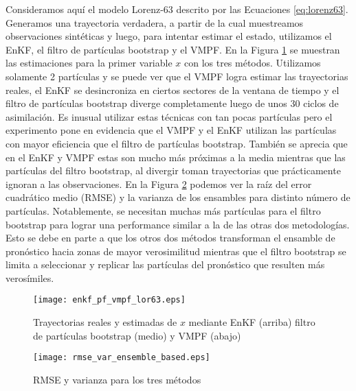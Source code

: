 Consideramos aquí el modelo Lorenz-63 descrito por las Ecuaciones \ref{eq:lorenz63}. Generamos una trayectoria verdadera, a partir de la cual muestreamos observaciones sintéticas y luego, para intentar estimar el estado, utilizamos el EnKF, el filtro de partículas bootstrap y el VMPF. En la Figura \ref{fig:enkf_pf_vmpf_lor63} se muestran las estimaciones para la primer variable $x$ con los tres métodos. Utilizamos solamente 2 partículas y se puede ver que el VMPF logra estimar las trayectorias reales, el EnKF se desincroniza en ciertos sectores de la ventana de tiempo y el filtro de partículas bootstrap diverge completamente luego de unos 30 ciclos de asimilación. Es inusual utilizar estas técnicas con tan pocas partículas pero el experimento pone en evidencia que el VMPF y el EnKF utilizan las partículas con mayor eficiencia que el filtro de partículas bootstrap. También se aprecia que en el EnKF y VMPF estas son mucho más próximas a la media mientras que las partículas del filtro bootstrap, al divergir toman trayectorias que prácticamente ignoran a las observaciones. En la Figura \ref{fig:rmse_var_ensemble_based} podemos ver la raíz del error cuadrático medio (RMSE) y la varianza de los ensambles para distinto número de partículas. Notablemente, se necesitan muchas más partículas para el filtro bootstrap para lograr una performance similar a la de las otras dos metodologías. Esto se debe en parte a que los otros dos métodos transforman el ensamble de pronóstico hacia zonas de mayor verosimilitud mientras que el filtro bootstrap se limita a seleccionar y replicar las partículas del pronóstico que resulten más verosímiles.

\begin{figure}[h]
    \centering
    \texttt{[image: enkf\_pf\_vmpf\_lor63.eps]}
    \caption{Trayectorias reales y estimadas de $x$ mediante EnKF (arriba) filtro de partículas bootstrap (medio) y VMPF (abajo)}
    \label{fig:enkf_pf_vmpf_lor63}
\end{figure}

\begin{figure}[h]
    \centering
    \texttt{[image: rmse\_var\_ensemble\_based.eps]}
    \caption{RMSE y varianza para los tres métodos}
    \label{fig:rmse_var_ensemble_based}
\end{figure}
